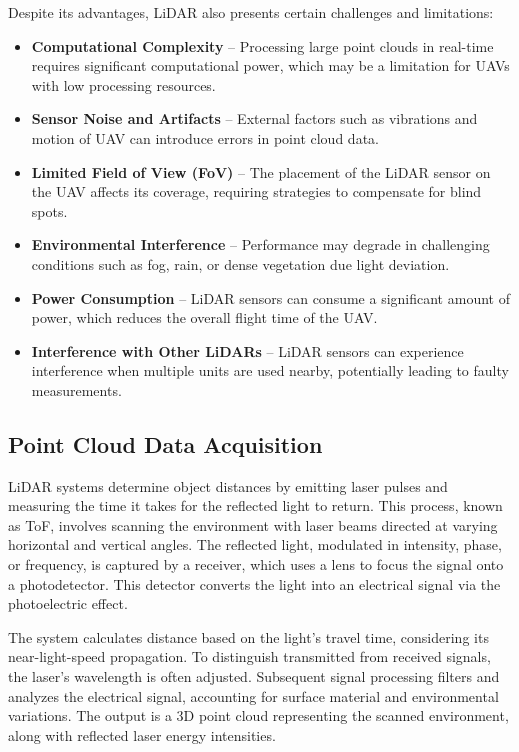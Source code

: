             Despite its advantages, \ac{LiDAR} also presents certain challenges and limitations:  
            \begin{itemize}  
                \item \textbf{Computational Complexity} -- Processing large point clouds in real-time requires significant computational power, which may be a limitation for \ac{UAV}s with low processing resources.
                \item \textbf{Sensor Noise and Artifacts} -- External factors such as vibrations and motion of \ac{UAV} can introduce errors in point cloud data.  
                \item \textbf{Limited Field of View (FoV)} -- The placement of the \ac{LiDAR} sensor on the \ac{UAV} affects its coverage, requiring strategies to compensate for blind spots.  
                \item \textbf{Environmental Interference} -- Performance may degrade in challenging conditions such as fog, rain, or dense vegetation due light deviation.  
                \item \textbf{Power Consumption} -- \ac{LiDAR} sensors can consume a significant amount of power, which reduces the overall flight time of the \ac{UAV}.
                \item \textbf{Interference with Other LiDARs} -- \ac{LiDAR} sensors can experience interference when multiple units are used nearby, potentially leading to faulty measurements.
            \end{itemize}

        \subsection{Point Cloud Data Acquisition}
            \ac{LiDAR} systems determine object distances by emitting laser pulses and measuring the time it takes for the reflected light to return. 
            This process, known as \ac{ToF}, involves scanning the environment with laser beams directed at varying horizontal and vertical angles. 
            The reflected light, modulated in intensity, phase, or frequency, is captured by a receiver, which uses a lens to focus the signal onto a photodetector. 
            This detector converts the light into an electrical signal via the photoelectric effect.

            The system calculates distance based on the light's travel time, considering its near-light-speed propagation. 
            To distinguish transmitted from received signals, the laser's wavelength is often adjusted. 
            Subsequent signal processing filters and analyzes the electrical signal, accounting for surface material and environmental variations. 
            The output is a 3D point cloud representing the scanned environment, along with reflected laser energy intensities.
            \cite{lidar_how_works}

